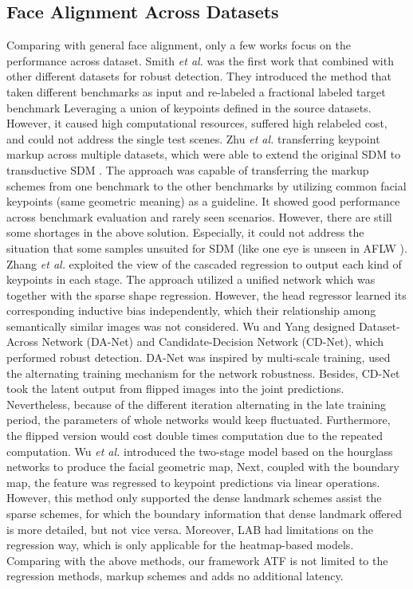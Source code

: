 \documentclass[journal,transmag]{IEEEtran}
\begin{document}
\subsection{Face Alignment Across Datasets}
Comparing with general face alignment, only a few works focus on the performance across dataset.
Smith \emph{et al.} \cite{smith2014collaborative} was the first work that combined with other different datasets for robust detection.
They introduced the method that taken different benchmarks as input and re-labeled a fractional labeled target benchmark Leveraging a union of keypoints defined in the source datasets. 
However, it caused high computational resources, suffered high relabeled cost, and could not address the single test scenes.
Zhu \emph{et al.} \cite{zhu2014transferring} transferring keypoint markup across multiple datasets, which were able to extend the original SDM to transductive SDM \cite{xiong2013supervised}.
The approach was capable of transferring the markup schemes from one benchmark to the other benchmarks by utilizing common facial keypoints (same geometric meaning) as a guideline.
It showed good performance across benchmark evaluation and rarely seen scenarios.
However, there are still some shortages in the above solution.
Especially, it could not address the situation that some samples unsuited for SDM (like one eye is unseen in AFLW \cite{AFLW}).
Zhang \emph{et al.} \cite{zhang2015leveraging} exploited the view of the cascaded regression to output each kind of keypoints in each stage. 
The approach utilized a unified network which was together with the sparse shape regression.
However, the head regressor learned its corresponding inductive bias independently, which their relationship among semantically similar images was not considered. 
Wu and Yang \cite{wu2017leveraging} designed Dataset-Across Network (DA-Net) and Candidate-Decision Network (CD-Net), which performed robust detection.
DA-Net was inspired by multi-scale training, used the alternating training mechanism for the network robustness.
Besides, CD-Net took the latent output from flipped images into the joint predictions.
Nevertheless, because of the different iteration alternating in the late training period, the parameters of whole networks would keep fluctuated.
Furthermore, the flipped version would cost double times computation due to the repeated computation.
Wu \emph{et al.} \cite{LABWFLW} introduced the two-stage model based on the hourglass\cite{yang2017stacked} networks to produce the facial geometric map,
Next, coupled with the boundary map, the feature was regressed to keypoint predictions via linear operations.
However, this method only supported the dense landmark schemes assist the sparse schemes, for which the boundary information that dense landmark offered is more detailed, but not vice versa. 
Moreover, LAB\cite{LABWFLW} had limitations on the regression way, which is only applicable for the heatmap-based models.
Comparing with the above methods, our framework ATF is not limited to the regression methods, markup schemes and adds no additional latency. 
\end{document}
